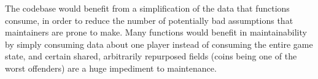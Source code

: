 \documentclass[11pt]{article}
\begin{document}
The codebase would benefit from a simplification of the data that functions consume, in order to reduce the number of potentially bad assumptions that maintainers are prone to make. Many functions would benefit in maintainability by simply consuming data about one player instead of consuming the entire game state, and certain shared, arbitrarily repurposed fields (coins being one of the worst offenders) are a huge impediment to maintenance.
\end{document}

